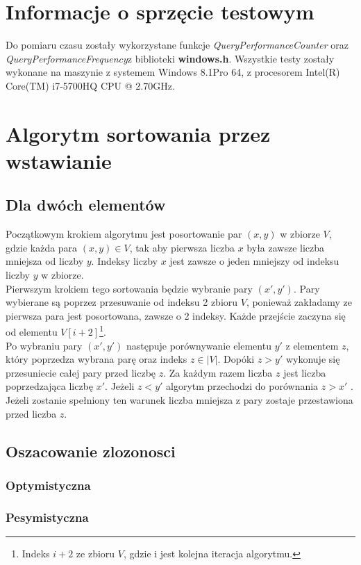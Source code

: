 \section{Informacje o sprzęcie testowym}
Do pomiaru czasu zostały wykorzystane funkcje \textit{QueryPerformanceCounter} oraz \textit{QueryPerformanceFrequency}z biblioteki \textbf{windows.h}. Wszystkie testy zostały wykonane na maszynie z systemem Windows 8.1Pro 64, z procesorem Intel(R) Core(TM) i7-5700HQ CPU @ 2.70GHz.
\section{Algorytm sortowania przez wstawianie}

\subsection*{Dla dwóch elementów}

Początkowym krokiem algorytmu jest posortowanie  par $(x,y) $ w zbiorze $V  $, gdzie każda para $(x,y) \in V$,  tak aby pierwsza liczba $x$  była zawsze liczba mniejsza od liczby $y$. Indeksy liczby $x$ jest zawsze o jeden mniejszy od indeksu liczby $y$ w zbiorze.\\
 Pierwszym krokiem tego sortowania będzie wybranie  pary $(x',y')$. Pary wybierane są poprzez przesuwanie od indeksu 2 zbioru $V$, ponieważ zakładamy ze pierwsza para jest posortowana, zawsze o 2 indeksy. Każde przejście zaczyna się od elementu $V[i+2]$\footnote{Indeks $i+2$ ze zbioru $V$, gdzie i jest kolejna iteracja algorytmu.}.\\
Po wybraniu pary $(x',y')$ następuje porównywanie elementu $y'$ z elementem $z$, który poprzedza wybrana parę oraz indeks $z \in \lvert V \rvert $. Dopóki  $z > y'$  wykonuje się przesuniecie całej pary przed liczbę $z$. Za każdym razem liczba $z$ jest liczba poprzedzająca liczbę $x'$.
Jeżeli  $z < y'$ algorytm przechodzi do porównania $z > x'$ . Jeżeli zostanie spełniony ten warunek liczba mniejsza z pary zostaje przestawiona przed liczba $z$.
\subsection*{Oszacowanie zlozonosci}
\subsubsection*{Optymistyczna}

\subsubsection*{Pesymistyczna}
